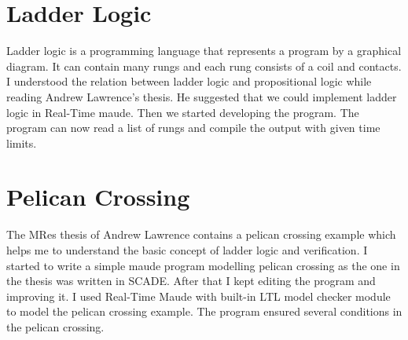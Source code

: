 \documentclass{article}
\begin{document}
\section{Ladder Logic}
Ladder logic is a programming language that represents a program by a graphical diagram. It can contain many rungs and each rung consists of a coil and contacts.
I understood the relation between ladder logic and propositional logic while reading Andrew Lawrence's thesis. He suggested that we could implement ladder logic in Real-Time maude. Then we started developing the program. The program can now read a list of rungs and compile the output with given time limits.
\section{Pelican Crossing}
The MRes thesis of Andrew Lawrence contains a pelican crossing example which helps me to understand the basic concept of ladder logic and verification. I started to write a simple maude program modelling pelican crossing as the one in the thesis was written in SCADE.  After that I kept editing the program and improving it. I used Real-Time Maude with built-in LTL model checker module to model the pelican crossing example. The program ensured several  conditions in the pelican crossing.
\end{document}
